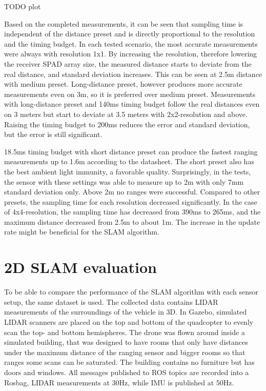 \documentclass[conference]{IEEEtran}
\begin{document}
TODO plot

Based on the completed measurements, it can be seen that sampling time is independent of the distance preset 
and is directly proportional to the resolution and the timing budget. In each tested 
scenario, the most accurate measurements were always with resolution 1x1. By increasing the resolution, therefore
lowering the receiver SPAD array size, the measured distance starts to deviate from the real distance, and 
standard deviation increases. This can be seen at 2.5m distance with medium preset. Long-distance preset, 
however produces more accurate measurements even on 3m, so it is preferred over medium preset. Measurements 
with long-distance preset and 140ms timing budget follow the real distances even on 3 meters but start to 
deviate at 3.5 meters with 2x2-resolution and above. Raising the timing budget to 200ms reduces the error 
and standard deviation, but the error is still significant.

18.5ms timing budget with short distance preset can produce the fastest ranging measurements up to 1.6m according
to the datasheet. The short preset also has the best ambient light immunity, a favorable quality. Surprisingly,
in the tests, the sensor with these settings was able to measure up to 2m with only 7mm standard deviation only. 
Above 2m no ranges were successful. Compared to other presets, the sampling time for each resolution decreased
significantly. In the case of 4x4-resolution, the sampling time has decreased from 390ms to 265ms, and the 
maximum distance decreased from 2.5m to about 1m. The increase in the update rate might be beneficial for 
the SLAM algorithm. 

\section{2D SLAM evaluation}

To be able to compare the performance of the SLAM algorithm with each sensor setup, the same dataset 
is used. The collected data contains LIDAR measurements of the surroundings of the vehicle in 3D. In Gazebo, 
simulated LIDAR scanners are placed on the top and bottom of the quadcopter to evenly scan the top- and bottom 
hemispheres. The drone was flown around inside a simulated building, that was designed to have rooms that only 
have distances under the maximum distance of the ranging sensor and bigger rooms so that ranges some scans 
can be saturated. The building contains no furniture but has doors and windows. All messages published to ROS
topics are recorded into a Rosbag, LIDAR measurements at 30Hz, while IMU is published at 50Hz.
\end{document}
